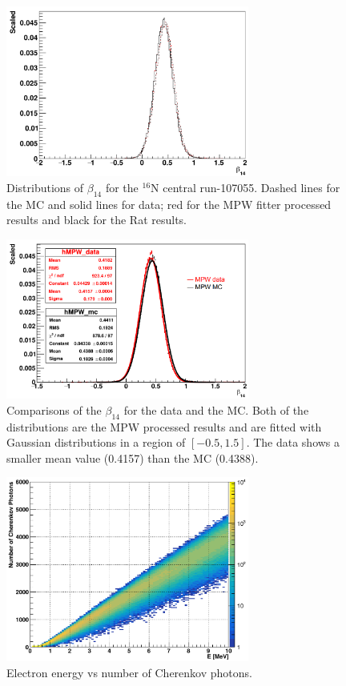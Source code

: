 \begin{figure}[htbp]
	\centering
	\includegraphics[width=8cm]{N16_beta14_107055.png}
	\caption{Distributions of $\beta_{14}$ for the $^{16}$N central run-107055. Dashed lines for the MC and solid lines for data; red for the MPW fitter processed results and black for the Rat results.}
	\label{N16beta14}
\end{figure}


\begin{figure}[htbp]
	\centering
	\includegraphics[width=8cm]{N16FitMPW_beta14_107055.png}
	\caption{Comparisons of the $\beta_{14}$ for the data and the MC. Both of the distributions are the MPW processed results and are fitted with Gaussian distributions in a region of $[-0.5,1.5]$. The data shows a smaller mean value (0.4157) than the MC (0.4388).}
	\label{N16beta14MPW}
\end{figure}

\begin{figure}[htbp]
	\centering
	\includegraphics[width=8cm]{2dmap_EvsNphoton.png}
	\caption{Electron energy vs number of Cherenkov photons.}
	\label{N16energyMap}
\end{figure}







